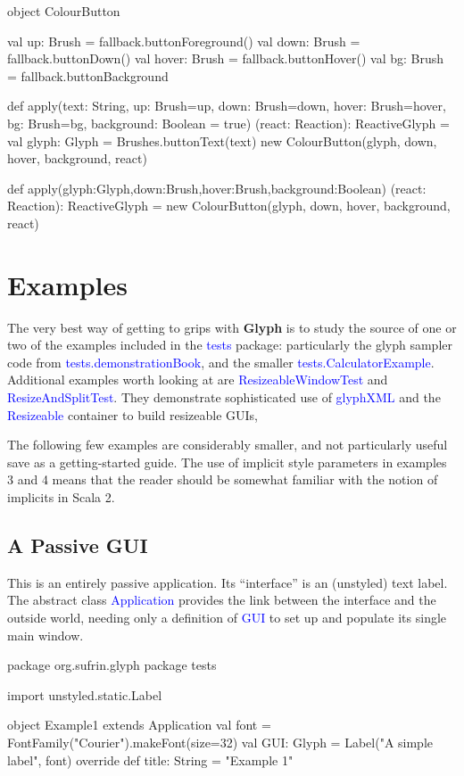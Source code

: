 \documentclass[12pt,a4paper]{article}
\def\Scala#1{\textcolor{blue}{\textsf{#1}}}
\def\S#1{\section{#1}}
\def\SS#1{\subsection{#1}}
\begin{document}
\begin{scala}
object ColourButton {
    val up:    Brush = fallback.buttonForeground()
    val down:  Brush = fallback.buttonDown()
    val hover: Brush = fallback.buttonHover()
    val bg:    Brush = fallback.buttonBackground

    def apply(text:  String,
           up: Brush=up, down: Brush=down, hover: Brush=hover,
           bg: Brush=bg, background: Boolean = true)
          (react: Reaction): ReactiveGlyph =
 { val glyph: Glyph = Brushes.buttonText(text)
   new ColourButton(glyph, down, hover, background, react)
 }


 def apply(glyph:Glyph,down:Brush,hover:Brush,background:Boolean)
          (react: Reaction): ReactiveGlyph =
     new ColourButton(glyph, down, hover, background, react)
}
\end{scala}
\clearpage
\S{Examples}

The very best way of getting to grips with \textbf{Glyph} is to
study the source of one or two of the examples included in the
\Scala{tests} package: particularly the glyph sampler code from
\Scala{tests.demonstrationBook}, and the smaller
\Scala{tests.CalculatorExample}.  Additional examples worth looking
at are \Scala{ResizeableWindowTest} and \Scala{ResizeAndSplitTest}.
They demonstrate sophisticated use of \Scala{glyphXML} 
and the \Scala{Resizeable} container to build resizeable GUIs,

The following few examples are considerably smaller, and not
particularly useful save as a getting-started guide.  The use of
implicit style parameters in examples 3 and 4 means that the reader
should be somewhat familiar with the notion of implicits in Scala
2.


\SS{A Passive GUI}

This is an entirely passive application.
Its ``interface'' is an (unstyled) text label.
The abstract class \Scala{Application} provides the link between
the interface and the outside world, needing only a definition of
\Scala{GUI} to set up and populate its single main window.

\begin{scala}
package org.sufrin.glyph
package tests

import unstyled.static.Label

object Example1 extends Application  {
  val font = FontFamily("Courier").makeFont(size=32)
  val GUI: Glyph = Label("A simple label", font)
  override def title: String = "Example 1"
}
\end{scala}
\end{document}
